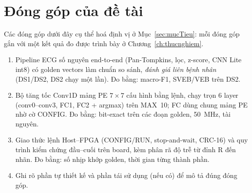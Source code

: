\section{Đóng góp của đề tài}\label{sec:dongGop}
Các đóng góp dưới đây cụ thể hoá định vị ở Mục~\ref{sec:mucTieu}: mỗi đóng góp gắn với một kết quả đo được trình bày ở Chương~\ref{ch:thucnghiem}.

\begin{goiy}
  \begin{enumerate}
    \item Pipeline ECG số nguyên end-to-end (Pan-Tompkins, lọc, z-score, CNN Lite int8) có golden vectors làm chuẩn so sánh, \emph{đánh giá liên bệnh nhân} (DS1/DS2, DS2 chạy một lần). Đo bằng: macro-F1, SVEB/VEB trên DS2.
    \item Bộ tăng tốc Conv1D mảng PE $7\times7$ cấu hình bằng lệnh, chạy trọn 6 layer (conv0--conv3, FC1, FC2 + argmax) trên MAX~10; FC dùng chung mảng PE nhờ cờ CONFIG. Đo bằng: bit-exact trên các đoạn golden, 50~MHz, tài nguyên.
    \item Giao thức lệnh Host--FPGA (CONFIG/RUN, stop-and-wait, CRC-16) và quy trình kiểm chứng đầu--cuối trên board, kèm phân rã độ trễ từ đỉnh R đến nhãn. Đo bằng: số nhịp khớp golden, thời gian từng thành phần.
    \item Ghi rõ phần tự thiết kế và phần tái sử dụng (nếu có) để mô tả đúng đóng góp.
  \end{enumerate}
\end{goiy}
